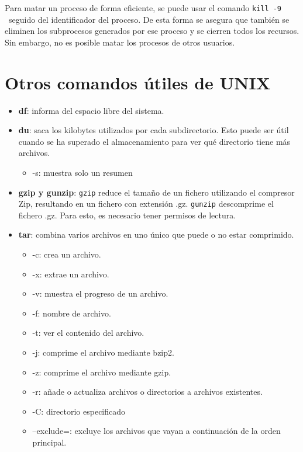 Para matar un proceso de forma eficiente, se puede usar el comando \texttt{kill -9}  \ seguido del identificador del proceso. De esta forma se asegura que también se eliminen los subprocesos generados por ese proceso y se cierren todos los recursos. Sin embargo, no es posible matar los procesos de otros usuarios.

\section{Otros comandos útiles de UNIX}
\begin{itemize}
\item \textbf{df}: informa del espacio libre del sistema.

\item \textbf{du}: saca los kilobytes utilizados por cada subdirectorio. Esto puede ser útil cuando se ha superado el almacenamiento para ver qué directorio tiene más archivos. \begin{itemize}
\item -s: muestra solo un resumen
\end{itemize}

\item \textbf{gzip y gunzip}: \texttt{gzip} reduce el tamaño de un fichero utilizando el compresor Zip, resultando en un fichero con extensión .gz. \texttt{gunzip} descomprime el fichero .gz. Para esto, es necesario tener permisos de lectura.

\item \textbf{tar}: combina varios archivos en uno único que puede o no estar comprimido. \begin{itemize}
\item -c: crea un archivo.
\item -x: extrae un archivo.
\item -v: muestra el progreso de un archivo.
\item -f: nombre de archivo.
\item -t: ver el contenido del archivo.
\item -j: comprime el archivo mediante bzip2.
\item -z: comprime el archivo mediante gzip.
\item -r: añade o actualiza archivos o directorios a archivos existentes.
\item -C: directorio especificado
\item --exclude=: excluye los archivos que vayan a continuación de la orden principal. 
\end{itemize}


\end{itemize}
